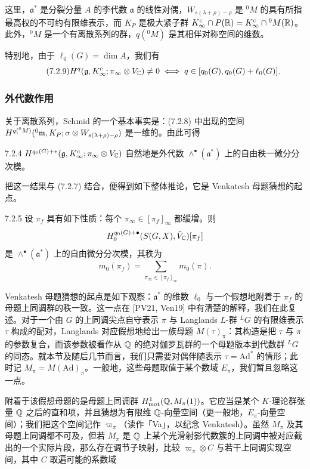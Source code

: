 
这里，$\mathfrak{a}^*$ 是分裂分量 $A$ 的李代数 $\mathfrak{a}$ 的线性对偶，$W_{s(\lambda+\rho)-\rho}$ 是 ${}^0M$ 的具有所指最高权的不可约有限维表示，而 $K_P$ 是极大紧子群 $K^c_\infty\cap P(\mathbb{R})=K^c_\infty\cap{}^0M(\mathbb{R})$。此外，${}^0M$ 是一个有离散系列的群，$q({}^0M)$ 是其相伴对称空间的维数。

特别地，由于 $\ell_0(G)=\dim A$，我们有
\begin{equation}\tag{7.2.9}\label{eq:a6-04-19}
H^q(\mathfrak{g},K^c_\infty;\pi_\infty\otimes V_{\mathbb{C}})\ne0
\iff q\in[q_0(G),q_0(G)+\ell_0(G)].
\end{equation}

\subsubsection{外代数作用}

关于离散系列，Schmid 的一个基本事实是：(7.2.8) 中出现的空间
$H^{q({}^0M)}({}^0\mathfrak{m},K_P;\sigma\otimes W_{s(\lambda+\rho)-\rho})$ 是一维的。由此可得

\begin{cor}{7.2.4}\label{thm:a6-04-16}
$H^{q_0(G)+*}(\mathfrak{g},K^c_\infty;\pi_\infty\otimes V_{\mathbb{C}})$ 自然地是外代数 $\wedge^\bullet(\mathfrak{a}^*)$ 上的自由秩一微分分次模。
\end{cor}

把这一结果与 (7.2.7) 结合，便得到如下整体推论，它是 Venkatesh 母题猜想的起点。

\begin{cor}{7.2.5}\label{thm:a6-04-17}
设 $\pi_f$ 具有如下性质：每个 $\pi_\infty\in[\pi_f]_\infty$ 都缓增。则
\[
H^{q_0(G)+\bullet}_0(S(G,X),\tilde V_{\mathbb{C}})[\pi_f]
\]
是 $\wedge^\bullet(\mathfrak{a}^*)$ 上的自由微分分次模，其秩为
\[
m_0(\pi_f)=\sum_{\pi_\infty\in[\pi_f]_\infty}m_0(\pi).
\]
\end{cor}

Venkatesh 母题猜想的起点是如下观察：$\mathfrak{a}^*$ 的维数 $\ell_0$ 与一个假想地附着于 $\pi_f$ 的母题上同调群的秩一致。这一点在 [PV21, Ven19] 中有清楚的解释，我们在此复述。对于一个由 $G$ 的上同调尖点自守表示 $\pi$ 与 Langlands $L$-群 ${}^LG$ 的有限维表示 $\tau$ 构成的配对，Langlands 对应假想地给出一族母题 $M(\tau)_\pi$：其构造是把 $\tau$ 与 $\pi$ 的参数复合，而该参数被看作从 $\mathbb{Q}$ 的绝对伽罗瓦群的一个母题版本到代数群 ${}^LG$ 的同态。就本节及随后几节而言，我们只需要对偶伴随表示 $\tau=\mathrm{Ad}^*$ 的情形；此时记 $M_\pi=M(\mathrm{Ad})_\pi$。一般地，这些母题取值于某个数域 $E_\pi$，我们暂且忽略这一点。

附着于该假想母题的是母题上同调群 $H^1_{\mathrm{mot}}(\mathbb{Q},M_\pi(1))$。它应当是某个 $K$-理论群张量 $\mathbb{Q}$ 之后的直和项，并且猜想为有限维 $\mathbb{Q}$-向量空间（更一般地，$E_\pi$-向量空间）；我们把这个空间记作 $\varpi_\pi$（读作「Va」，以纪念 Venkatesh）。虽然 $M_\pi$ 及其母题上同调都不可及，但若 $M_\pi$ 是 $\mathbb{Q}$ 上某个光滑射影代数簇的上同调中被对应截出的一个实际片段，那么存在调节子映射，比较 $\varpi_\pi\otimes C$ 与若干上同调实现空间，其中 $C$ 取遍可能的系数域
